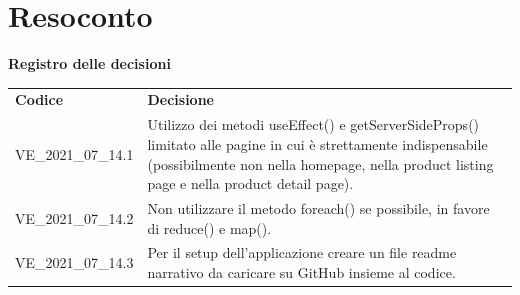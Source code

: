 \documentclass[a4paper]{article}
\begin{document}
\section{Resoconto}
\begin{center}
    \textbf{\Large Registro delle decisioni}\\
    \vspace{10px}
    \begin{table}[h!]
        \centering
        \renewcommand{\arraystretch}{1.8}
        \begin{tabular}{p{200px} p{200px}}
            \rowcolor{logo!70} \textbf{Codice} & \textbf{Decisione}                                                                                                                                                                                           \\
            VE\_2021\_07\_14.1                 & Utilizzo dei metodi useEffect() e getServerSideProps() limitato alle pagine in cui è strettamente indispensabile (possibilmente non nella homepage, nella product listing page e nella product detail page). \\
            VE\_2021\_07\_14.2                 & Non utilizzare il metodo foreach() se possibile, in favore di reduce() e map().                                                                                                                              \\
            VE\_2021\_07\_14.3                 & Per il setup dell'applicazione creare un file readme narrativo da caricare su GitHub insieme al codice.                                                                                                      \\
        \end{tabular}
    \end{table}
\end{center}
\end{document}
